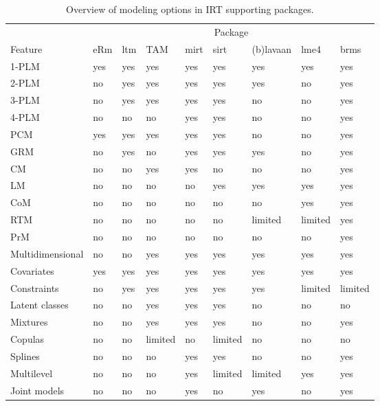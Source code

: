 \documentclass[jss]{jss}
\begin{document}
\begin{CodeChunk}
\begin{table}[t]

\caption{\label{tab:pkg-compare}Overview of modeling options in IRT supporting packages.}
\centering
\begin{threeparttable}
\begin{tabular}{lllllllll}
\toprule
\multicolumn{1}{c}{ } & \multicolumn{8}{c}{Package} \\
\cmidrule(l{3pt}r{3pt}){2-9}
Feature & eRm & ltm & TAM & mirt & sirt & (b)lavaan & lme4 & brms\\
\hline
1-PLM & yes & yes & yes & yes & yes & yes & yes & yes\\
2-PLM & no & yes & yes & yes & yes & yes & no & yes\\
3-PLM & no & yes & yes & yes & yes & no & no & yes\\
4-PLM & no & no & no & yes & yes & no & no & yes\\
\addlinespace
PCM & yes & yes & yes & yes & yes & no & no & yes\\
GRM & no & yes & no & yes & yes & yes & no & yes\\
CM & no & no & yes & yes & no & no & no & yes\\
LM & no & no & no & no & yes & yes & yes & yes\\
CoM & no & no & no & no & no & no & yes & yes\\
\addlinespace
RTM & no & no & no & no & no & limited & limited & yes\\
PrM & no & no & no & no & no & no & no & yes\\
\hline
Multidimensional & no & no & yes & yes & yes & yes & yes & yes\\
Covariates & yes & yes & yes & yes & yes & yes & yes & yes\\
Constraints & no & yes & yes & yes & yes & yes & limited & limited\\
\addlinespace
Latent classes & no & no & yes & yes & yes & no & no & no\\
Mixtures & no & no & yes & yes & yes & no & no & yes\\
Copulas & no & no & limited & no & limited & no & no & no\\
Splines & no & no & no & yes & yes & no & no & yes\\
Multilevel & no & no & no & yes & limited & limited & yes & yes\\
\addlinespace
Joint models & no & no & no & yes & no & yes & no & yes\\

\end{tabular}
\end{threeparttable}
\end{table}
\end{CodeChunk}
\end{document}
